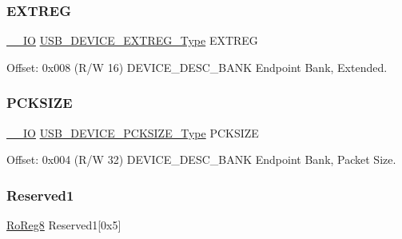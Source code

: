 \subsubsection{\texorpdfstring{EXTREG}{EXTREG}}
{\footnotesize\ttfamily \mbox{\hyperlink{core__cm0plus_8h_aec43007d9998a0a0e01faede4133d6be}{\+\_\+\+\_\+\+IO}} \mbox{\hyperlink{union_u_s_b___d_e_v_i_c_e___e_x_t_r_e_g___type}{U\+S\+B\+\_\+\+D\+E\+V\+I\+C\+E\+\_\+\+E\+X\+T\+R\+E\+G\+\_\+\+Type}} E\+X\+T\+R\+EG}



Offset\+: 0x008 (R/W 16) D\+E\+V\+I\+C\+E\+\_\+\+D\+E\+S\+C\+\_\+\+B\+A\+NK Endpoint Bank, Extended. 

\mbox{\label{struct_usb_device_desc_bank_a3b250154bc654a92ad466699f38b5f1d}} 
\subsubsection{\texorpdfstring{PCKSIZE}{PCKSIZE}}
{\footnotesize\ttfamily \mbox{\hyperlink{core__cm0plus_8h_aec43007d9998a0a0e01faede4133d6be}{\+\_\+\+\_\+\+IO}} \mbox{\hyperlink{union_u_s_b___d_e_v_i_c_e___p_c_k_s_i_z_e___type}{U\+S\+B\+\_\+\+D\+E\+V\+I\+C\+E\+\_\+\+P\+C\+K\+S\+I\+Z\+E\+\_\+\+Type}} P\+C\+K\+S\+I\+ZE}



Offset\+: 0x004 (R/W 32) D\+E\+V\+I\+C\+E\+\_\+\+D\+E\+S\+C\+\_\+\+B\+A\+NK Endpoint Bank, Packet Size. 

\mbox{\label{struct_usb_device_desc_bank_a63b7508a517d1f83bd45a93c1a7f2567}} 
\subsubsection{\texorpdfstring{Reserved1}{Reserved1}}
{\footnotesize\ttfamily \mbox{\hyperlink{group___s_a_m_d21_e15_a__definitions_ga0d957f1433aaf5d70e4dc2b68288442d}{Ro\+Reg8}} Reserved1\mbox{[}0x5\mbox{]}}

\mbox{\label{struct_usb_device_desc_bank_a9aa0d666580c9f3c48ea3193f8d60961}} 
